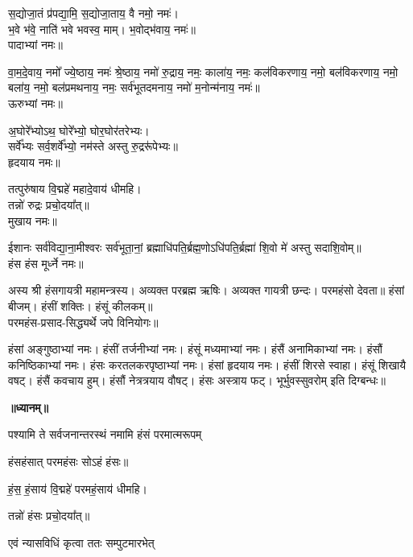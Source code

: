 स॒द्योजा॒तं प्र॑पद्या॒मि॒ स॒द्योजा॒ताय॒ वै नमो॒ नमः॑।\\
भ॒वे भ॑वे॒ नाति॑ भवे भवस्व॒ माम्। भ॒वोद्भ॑वाय॒ नमः॑॥ \\
पादाभ्यां नमः॥

वा॒म॒दे॒वाय॒ नमो᳚ ज्ये॒ष्ठाय॒ नमः॑ श्रे॒ष्ठाय॒ नमो॑ रु॒द्राय॒ नमः॒ काला॑य॒ नमः॒ कल॑विकरणाय॒ नमो॒ बल॑विकरणाय॒ नमो॒ बला॑य॒ नमो॒ बल॑प्रमथनाय॒ नमः॒ सर्व॑भूतदमनाय॒ नमो॑ म॒नोन्म॑नाय॒ नमः॑॥\\
ऊरुभ्यां नमः॥ 

अ॒घोरे᳚भ्योऽथ॒ घोरे᳚भ्यो॒ घोर॒घोर॑तरेभ्यः।\\
सर्वे᳚भ्यः सर्व॒शर्वे᳚भ्यो॒ नम॑स्ते अस्तु रु॒द्ररू॑पेभ्यः॥\\
हृदयाय नमः॥ 

तत्पुरु॑षाय वि॒द्महे॑ महादे॒वाय॑ धीमहि।\\
तन्नो॑ रुद्रः प्रचो॒दया᳚त्॥\\
मुखाय नमः॥ 

ईशानः सर्व॑विद्या॒ना॒मीश्वरः सर्व॑भूता॒नां॒ ब्रह्माधि॑पति॒र्ब्रह्म॒णो\-ऽधि॑पति॒र्ब्रह्मा॑ शि॒वो मे॑ अस्तु सदाशि॒वोम्॥\\
हंस हंस मूर्ध्ने नमः॥ \\
{\small \closesection}

अस्य श्री हंसगायत्री महामन्त्रस्य। अव्यक्त परब्रह्म ऋषिः। अव्यक्त गायत्री छन्दः। परमहंसो देवता॥ हंसां बीजम्। हंसीं शक्तिः। हंसूं कीलकम्॥\\
परमहंस-प्रसाद-सिद्ध्यर्थे जपे विनियोगः॥

हंसां अङ्गुष्ठाभ्यां नमः।
हंसीं तर्जनीभ्यां नमः।
हंसूं मध्यमाभ्यां नमः।
हंसैं अनामिकाभ्यां नमः।
हंसौं कनिष्ठिकाभ्यां नमः।
हंसः करतलकरपृष्ठाभ्यां नमः।
हंसां हृदयाय नमः।
हंसीं शिरसे स्वाहा।
हंसूं शिखायै वषट्।
हंसैं कवचाय हुम्।
हंसौं नेत्रत्रयाय वौषट्।
हंसः अस्त्राय फट्।
भूर्भुवस्सुवरोम् इति दिग्बन्धः॥

\centerline{\textbf{॥ध्यानम्॥}}

{पश्यामि ते सर्वजनान्तरस्थं नमामि हंसं परमात्मरूपम्}
\smallskip
\centerline{हंसहंसात् परमहंसः सोऽहं हंसः॥}
\smallskip
\centerline{हं॒स॒ हं॒साय॑ वि॒द्महे॑ परमहं॒साय॑ धीमहि।}
\centerline{तन्नो॑ हंसः प्रचो॒दया᳚त्॥ } 
\begin{flushright}
\vspace{-5.7ex}{\small (एवं त्रिः)}
\end{flushright}

{एवं न्यासविधिं कृत्वा ततः सम्पुटमारभेत्}

